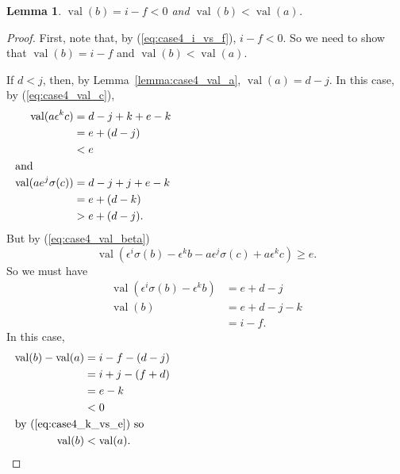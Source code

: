 \documentclass{amsart}
\newtheorem{lemma}{Lemma}[subsection]
\theoremstyle{definition}
\def\e{\epsilon}
\def\val{\mathop{\mathrm{val}}}
\def\s{\sigma}
\begin{document}
  \begin{lemma}
    \label{lemma:case4_val_b}
    $\val(b) = i - f < 0$ and $\val(b) < \val(a)$.
  \end{lemma}
  \begin{proof}
    First, note that, by (\ref{eq:case4_i_vs_f}), $i - f < 0$.  So we need to
    show that $\val(b) = i - f$ and $\val(b) < \val(a)$.

    If $d < j$, then, by Lemma~\ref{lemma:case4_val_a}, $\val(a) = d
    - j$.  In this case, by (\ref{eq:case4_val_c}),
    \begin{align}
      \val(a\e^k c) &= d - j + k + e - k \nonumber \\
                    &= e + (d - j) \nonumber \\
                    &< e \nonumber \\
      \noalign{\noindent and}
      \val(ae^j\s(c)) &= d - j + j + e - k \nonumber \\
      \label{eq:case4_trailing_term_d_less_j}
                      &= e + (d - k) \\
                      &> e + (d - j). \nonumber
    \end{align}
    But by (\ref{eq:case4_val_beta})
    \begin{equation}
      \label{eq:case4_expand_beta}
      \val(\e^i\s(b) - \e^k b - a\e^j\s(c) + a\e^k c) \ge e.
    \end{equation}
    So we must have
    \begin{align*}
      \val(\e^i\s(b) - \e^k b) &= e + d - j \\
      \val(b) &= e + d - j - k \\
              &= i - f.
    \end{align*}
    In this case,
    \begin{align*}
      \val(b) - \val(a) &= i - f - (d - j) \\
                        &= i + j - (f + d) \\
                        &= e - k \\
                        &< 0 \\
      \noalign{\noindent by (\ref{eq:case4_k_vs_e}) so}
      \val(b) &< \val(a).
    \end{align*}


\end{proof}
\end{document}
